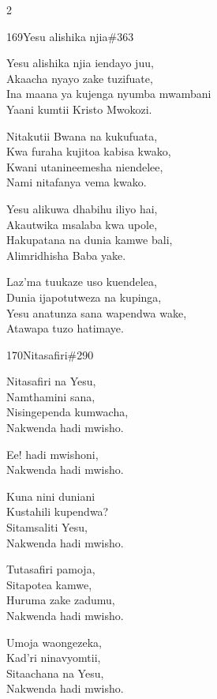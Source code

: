 \documentclass{article}
\begin{document}
\begin{multicols}{2}
\begin{hymn}{169}{Yesu alishika njia}{\#363}
\begin{stanza}
Yesu alishika njia iendayo juu,\\
Akaacha nyayo zake tuzifuate,\\
Ina maana ya kujenga nyumba mwambani\\
Yaani kumtii Kristo Mwokozi.
\end{stanza}
\begin{chorus}
Nitakutii Bwana na kukufuata,\\
Kwa furaha kujitoa kabisa kwako,\\
Kwani utanineemesha niendelee,\\
Nami nitafanya vema kwako.
\end{chorus}
\begin{stanza}
Yesu alikuwa dhabihu iliyo hai,\\
Akautwika msalaba kwa upole,\\
Hakupatana na dunia kamwe bali,\\
Alimridhisha Baba yake.
\end{stanza}
\begin{stanza}
Laz'ma tuukaze uso kuendelea,\\
Dunia ijapotutweza na kupinga,\\
Yesu anatunza sana wapendwa wake,\\
Atawapa tuzo hatimaye.
\end{stanza}
\end{hymn}

\begin{hymn}{170}{Nitasafiri}{\#290}
\begin{stanza}
Nitasafiri na Yesu,\\
Namthamini sana,\\
Nisingependa kumwacha,\\
Nakwenda hadi mwisho.
\end{stanza}
\begin{chorus}
Ee! hadi mwishoni,\\
Nakwenda hadi mwisho.
\end{chorus}
\begin{stanza}
Kuna nini duniani\\
Kustahili kupendwa?\\
Sitamsaliti Yesu,\\
Nakwenda hadi mwisho.
\end{stanza}
\begin{stanza}
Tutasafiri pamoja,\\
Sitapotea kamwe,\\
Huruma zake zadumu,\\
Nakwenda hadi mwisho.
\end{stanza}
\begin{stanza}
Umoja waongezeka,\\
Kad'ri ninavyomtii,\\
Sitaachana na Yesu,\\
Nakwenda hadi mwisho.
\end{stanza}
\end{hymn}


\end{multicols}
\end{document}
